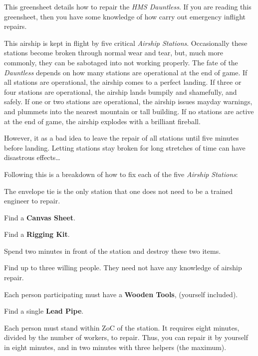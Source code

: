 \documentclass[green]{airship}
\begin{document}
\name{\gRepair{}}

This greensheet details how to repair the {\it HMS Dauntless}. If you are reading this greensheet, then you have some knowledge of how carry out emergency inflight repairs.

This airship is kept in flight by five critical {\it Airship Stations}. Occasionally these stations become broken through normal wear and tear, but, much more commonly, they can be sabotaged into not working properly. The fate of the {\it Dauntless} depends on how many stations are operational at the end of game. If all stations are operational, the airship comes to a perfect landing. If three or four stations are operational, the airship lands bumpily and shamefully, and safely. If one or two stations are operational, the airship issues mayday warnings, and plummets into the nearest mountain or tall building. If no stations are active at the end of game, the airship explodes with a brilliant fireball.

However, it as a bad idea to leave the repair of all stations until five minutes before landing. Letting stations stay broken for long stretches of time can have disastrous effects{\ldots}

Following this is a breakdown of how to fix each of the five {\it Airship Stations}:

\begin{enum}
  \item The envelope tie is the only station that one does not need to be a trained engineer to repair.
  \item Find a {\bf Canvas Sheet}.
  \item Find a {\bf Rigging Kit}.
  \item Spend two minutes in front of the station and destroy these two items.
\end{enum}

\begin{enum}
  \item Find up to three willing people. They need not have any knowledge of airship repair.
  \item Each person participating must have a {\bf Wooden Tools}, (yourself included).
  \item Find a single {\bf Lead Pipe}.
  \item Each person must stand within ZoC of the station. It requires eight minutes, divided by the number of workers, to repair. Thus, you can repair it by yourself in eight minutes, and in two minutes with three helpers (the maximum).
\end{enum}
\end{document}
